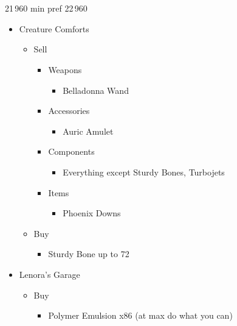 \chapter{}


\begin{shop}{21\,960 min pref 22\,960}
\begin{multicols}{2}
\begin{itemize}
    \item Creature Comforts
    \begin{itemize}
        \item Sell
        \begin{itemize}
            \item Weapons
            \begin{itemize}
                \item Belladonna Wand
            \end{itemize}
            \item Accessories
            \begin{itemize}
                \item Auric Amulet
            \end{itemize}
            \item Components
            \begin{itemize}
                \item Everything except Sturdy Bones, Turbojets
            \end{itemize}
            \item Items
            \begin{itemize}
                \item Phoenix Downs
            \end{itemize}
        \end{itemize}
        \item Buy
        \begin{itemize}
            \item Sturdy Bone up to 72
        \end{itemize}
    \end{itemize}
    \columnbreak
    \item Lenora's Garage
    \begin{itemize}
        \item Buy
        \begin{itemize}
            \item Polymer Emulsion x86 (at max do what you can)
        \end{itemize}
    \end{itemize}
\end{itemize}
\end{multicols}
\end{shop}

